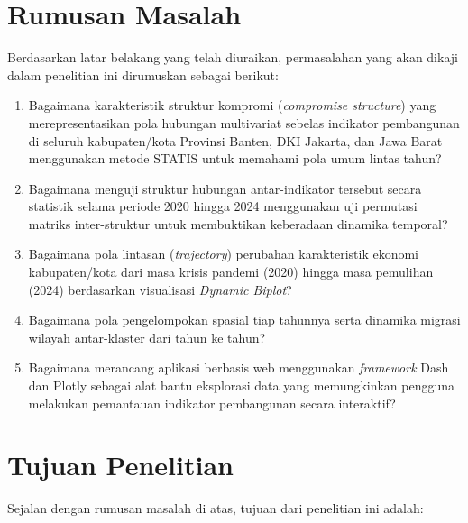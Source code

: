 \section{\normalsize Rumusan Masalah}
Berdasarkan latar belakang yang telah diuraikan, permasalahan yang akan dikaji dalam penelitian ini dirumuskan sebagai berikut:

\begin{enumerate}
    \item Bagaimana karakteristik struktur kompromi (\textit{compromise structure}) yang merepresentasikan pola hubungan multivariat sebelas indikator pembangunan di seluruh kabupaten/kota Provinsi Banten, DKI Jakarta, dan Jawa Barat menggunakan metode STATIS untuk memahami pola umum lintas tahun?
    \item Bagaimana menguji struktur hubungan antar-indikator tersebut secara statistik selama periode 2020 hingga 2024 menggunakan uji permutasi matriks inter-struktur untuk membuktikan keberadaan dinamika temporal?
    \item Bagaimana pola lintasan (\textit{trajectory}) perubahan karakteristik ekonomi kabupaten/kota dari masa krisis pandemi (2020) hingga masa pemulihan (2024) berdasarkan visualisasi \textit{Dynamic Biplot}?
    \item Bagaimana pola pengelompokan spasial tiap tahunnya serta dinamika migrasi wilayah antar-klaster dari tahun ke tahun?
    \item Bagaimana merancang aplikasi berbasis web menggunakan \textit{framework} Dash dan Plotly sebagai alat bantu eksplorasi data yang memungkinkan pengguna melakukan pemantauan indikator pembangunan secara interaktif?
\end{enumerate}

\section{\normalsize Tujuan Penelitian}
Sejalan dengan rumusan masalah di atas, tujuan dari penelitian ini adalah:

